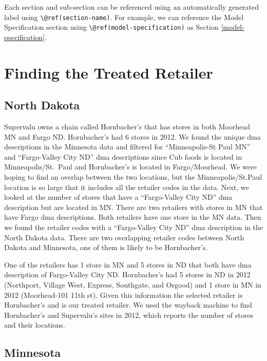\documentclass[12pt,titlepage]{mktg-article}
\begin{document}
Each section and sub-section can be referenced using an automatically generated label using \texttt{\textbackslash{}@ref(section-name)}. For example, we can reference the Model Specification section using \texttt{\textbackslash{}@ref(model-specification)} as Section \ref{model-specification}.

\hypertarget{finding-the-treated-retailer}{%
\section{Finding the Treated Retailer}\label{finding-the-treated-retailer}}

\hypertarget{north-dakota}{%
\subsection{North Dakota}\label{north-dakota}}

Supervalu owns a chain called Hornbacher's that has stores in both Moorhead MN and Fargo ND. Hornbacher's had 6 stores in 2012. We found the unique dma descriptions in the Minnesota data and filtered for ``Minneapolis-St Paul MN'' and ``Fargo-Valley City ND'' dma descriptions since Cub foods is located in Minneapolis/St.~Paul and Hornbacher's is located in Fargo/Moorhead. We were hoping to find an overlap between the two locations, but the Minneapolis/St.Paul location is so large that it includes all the retailer codes in the data. Next, we looked at the number of stores that have a ``Fargo-Valley City ND'' dma description but are located in MN. There are two retailers with stores in MN that have Fargo dma descriptions. Both retailers have one store in the MN data. Then we found the retailer codes with a ``Fargo-Valley City ND'' dma description in the North Dakota data. There are two overlapping retailer codes between North Dakota and Minnesota, one of them is likely to be Hornbacher's.

One of the retailers has 1 store in MN and 5 stores in ND that both have dma description of Fargo-Valley City ND. Hornbacher's had 5 stores in ND in 2012 (Northport, Village West, Express, Southgate, and Osgood) and 1 store in MN in 2012 (Moorhead-101 11th st). Given this information the selected retailer is Hornbacher's and is our treated retailer. We used the wayback machine to find Hornbacher's and Supervalu's sites in 2012, which reports the number of stores and their locations.

\hypertarget{minnesota}{%
\subsection{Minnesota}\label{minnesota}}
\end{document}
